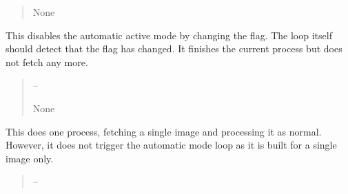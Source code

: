 \documentclass[letterpaper,11pt,english]{sphinxmanual}
\begin{document}
\begin{savenotes}
\begin{fulllineitems}
\begin{savenotes}
\begin{fulllineitems}
\begin{quote}
\begin{description}
\sphinxAtStartPar
None

\end{description}\end{quote}

\end{fulllineitems}\end{savenotes}


\begin{savenotes}\begin{fulllineitems}
\label{\detokenize{code/opihiexarata.gui.automatic:opihiexarata.gui.automatic.OpihiAutomaticWindow.__connect_push_button_stop}}
\pysigstartsignatures
{}
\pysigstopsignatures
\sphinxAtStartPar
This disables the automatic active mode by changing the flag. The
loop itself should detect that the flag has changed. It finishes the
current process but does not fetch any more.
\begin{quote}\begin{description}
\sphinxAtStartPar
{} – 

\sphinxAtStartPar
None

\end{description}\end{quote}

\end{fulllineitems}\end{savenotes}


\begin{savenotes}\begin{fulllineitems}
\label{\detokenize{code/opihiexarata.gui.automatic:opihiexarata.gui.automatic.OpihiAutomaticWindow.__connect_push_button_trigger}}
\pysigstartsignatures
{}
\pysigstopsignatures
\sphinxAtStartPar
This does one process, fetching a single image and processing it as
normal. However, it does not trigger the automatic mode loop as it is
built for a single image only.
\begin{quote}\begin{description}
\sphinxAtStartPar
{} – 


\end{description}
\end{quote}
\end{fulllineitems}
\end{savenotes}
\end{fulllineitems}
\end{savenotes}
\end{document}

